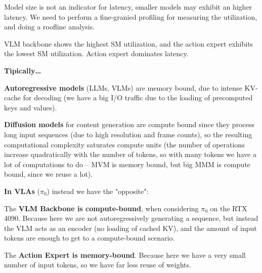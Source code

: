 \begin{dashlist}
    \item Model size is not an indicator for latency, smaller models may exhibit an higher latency. We need to perform a fine-granied profiling for measuring the utilization, and doing a roofline analysis.
    \item VLM backbone shows the highest SM utilization, and the action expert exhibits the lowest SM utilization. Action expert dominates latency.
    \item \textbf{Tipically\dots}
    \begin{dashlist}
        \item \textbf{Autoregressive models} (LLMs, VLMs) are memory bound, due to intense KV-cache for decoding (we have a big I/O traffic due to the loading of precomputed keys and values).
        \item \textbf{Diffusion models} for content generation are compute bound since they process long input sequences (due to high resolution and frame counts), so the resulting computational complexity saturates compute units (the number of operations increase quadratically with the number of tokens, so with many tokens we have a lot of computations to do -- MVM is memory bound, but big MMM is compute bound, since we reuse a lot).
    \end{dashlist}

    \item \textbf{In VLAs} ($\pi_0$) instead we have the "opposite":
    \begin{dashlist}
        \item The \textbf{VLM Backbone is compute-bound}, when considering $\pi_0$ on the RTX 4090. Because here we are not autoregressively generating a sequence, but instead the VLM acts as an encoder (no loading of cached KV), and the amount of input tokens are enough to get to a compute-bound scenario.
        \item The \textbf{Action Expert is memory-bound}. Because here we have a very small number of input tokens, so we have far less reuse of weights.
    \end{dashlist}
\end{dashlist}

